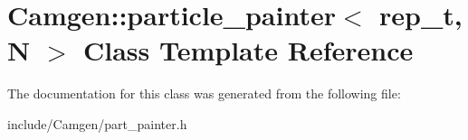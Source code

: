 \hypertarget{a00398}{\section{Camgen\-:\-:particle\-\_\-painter$<$ rep\-\_\-t, N $>$ Class Template Reference}
\label{a00398}
}


The documentation for this class was generated from the following file\-:\begin{DoxyCompactItemize}
\item 
include/\-Camgen/part\-\_\-painter.\-h\end{DoxyCompactItemize}
